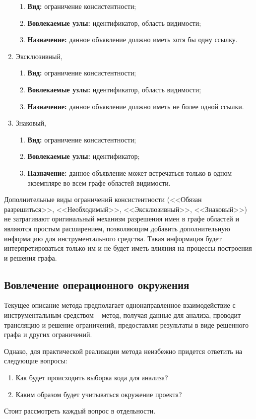 \begin{enumerate}
\begin{enumerate}
        \item \textbf{Вид:} ограничение консистентности;
        \item \textbf{Вовлекаемые узлы:} идентификатор, область видимости;
        \item \textbf{Назначение:} данное объявление должно иметь хотя бы одну ссылку.
    \end{enumerate}
    \item Эксклюзивный,
    \begin{enumerate}
        \item \textbf{Вид:} ограничение консистентности;
        \item \textbf{Вовлекаемые узлы:} идентификатор, область видимости;
        \item \textbf{Назначение:} данное объявление должно иметь не более одной ссылки.
    \end{enumerate}
    \item Знаковый,
    \begin{enumerate}
        \item \textbf{Вид:} ограничение консистентности;
        \item \textbf{Вовлекаемые узлы:} идентификатор;
        \item \textbf{Назначение:} данное объявление может встречаться только
        в одном экземпляре во всем графе областей видимости.
    \end{enumerate}
\end{enumerate}

Дополнительные виды ограничений консистентности (<<Обязан разрешиться>>, <<Необходимый>>, <<Эксклюзивный>>, <<Знаковый>>) не затрагивают
оригинальный механизм разрешения имен в графе областей и являются простым расширением, позволяющим добавить
дополнительную информацию для инструментального средства. Такая информация будет интерпретироваться только
им и не будет иметь влияния на процессы построения и решения графа.

\subsection{Вовлечение операционного окружения}

Текущее описание метода предполагает однонаправленное взаимодействие с инструментальным средством -- метод,
получая данные для анализа, проводит трансляцию и решение ограничений, предоставляя результаты в виде решенного
графа и других ограничений.

Однако, для практической реализации метода неизбежно придется ответить на следующие вопросы:
\begin{enumerate}[1.]
    \item Как будет происходить выборка кода для анализа?
    \item Каким образом будет учитываться окружение проекта?
\end{enumerate}
Стоит рассмотреть каждый вопрос в отдельности.

